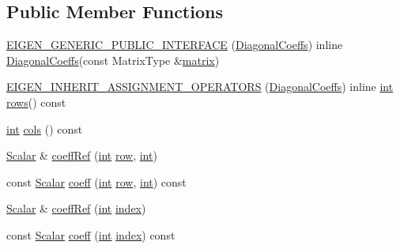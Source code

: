 \subsection*{Public Member Functions}
\begin{DoxyCompactItemize}
\item 
\hyperlink{class_diagonal_coeffs_a9d5a93cd0e1dd32b2bbdcfdf939b108c}{E\-I\-G\-E\-N\-\_\-\-G\-E\-N\-E\-R\-I\-C\-\_\-\-P\-U\-B\-L\-I\-C\-\_\-\-I\-N\-T\-E\-R\-F\-A\-C\-E} (\hyperlink{class_diagonal_coeffs}{Diagonal\-Coeffs}) inline \hyperlink{class_diagonal_coeffs}{Diagonal\-Coeffs}(const Matrix\-Type \&\hyperlink{glext_8h_a7b24a3f2f56eb1244ae69dacb4fecb6f}{matrix})
\item 
\hyperlink{class_diagonal_coeffs_aaa4cee0edf8cef0d4309c69bc9f268a5}{E\-I\-G\-E\-N\-\_\-\-I\-N\-H\-E\-R\-I\-T\-\_\-\-A\-S\-S\-I\-G\-N\-M\-E\-N\-T\-\_\-\-O\-P\-E\-R\-A\-T\-O\-R\-S} (\hyperlink{class_diagonal_coeffs}{Diagonal\-Coeffs}) inline \hyperlink{ioapi_8h_a787fa3cf048117ba7123753c1e74fcd6}{int} \hyperlink{class_matrix_base_ae82810ba95da637cdf434b4274083723}{rows}() const 
\item 
\hyperlink{ioapi_8h_a787fa3cf048117ba7123753c1e74fcd6}{int} \hyperlink{class_diagonal_coeffs_a59d76e2c3111f0c1369738471043e93b}{cols} () const 
\item 
\hyperlink{class_matrix_base_a625df8339dc2d816cbc0fd66e7dadaf5}{Scalar} \& \hyperlink{class_diagonal_coeffs_ac851b03adba19d13835e7bf7105a1bba}{coeff\-Ref} (\hyperlink{ioapi_8h_a787fa3cf048117ba7123753c1e74fcd6}{int} \hyperlink{glext_8h_a11b277b422822f784ee248b43eee3e1e}{row}, \hyperlink{ioapi_8h_a787fa3cf048117ba7123753c1e74fcd6}{int})
\item 
const \hyperlink{class_matrix_base_a625df8339dc2d816cbc0fd66e7dadaf5}{Scalar} \hyperlink{class_diagonal_coeffs_a79ec6300c8535ad19f3f395b87b955e2}{coeff} (\hyperlink{ioapi_8h_a787fa3cf048117ba7123753c1e74fcd6}{int} \hyperlink{glext_8h_a11b277b422822f784ee248b43eee3e1e}{row}, \hyperlink{ioapi_8h_a787fa3cf048117ba7123753c1e74fcd6}{int}) const 
\item 
\hyperlink{class_matrix_base_a625df8339dc2d816cbc0fd66e7dadaf5}{Scalar} \& \hyperlink{class_diagonal_coeffs_a84e12ddfbd646ed19ae63244213d85a9}{coeff\-Ref} (\hyperlink{ioapi_8h_a787fa3cf048117ba7123753c1e74fcd6}{int} \hyperlink{glext_8h_ab47dd9958bcadea08866b42bf358e95e}{index})
\item 
const \hyperlink{class_matrix_base_a625df8339dc2d816cbc0fd66e7dadaf5}{Scalar} \hyperlink{class_diagonal_coeffs_a4b7eb44df291de20939a654658b1a56f}{coeff} (\hyperlink{ioapi_8h_a787fa3cf048117ba7123753c1e74fcd6}{int} \hyperlink{glext_8h_ab47dd9958bcadea08866b42bf358e95e}{index}) const 
\end{DoxyCompactItemize}
